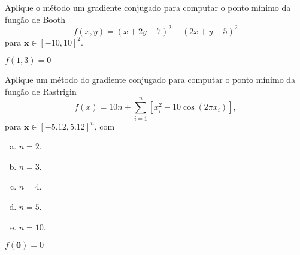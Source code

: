 \begin{exer}
  Aplique o método um gradiente conjugado para computar o ponto mínimo da função de Booth
  \begin{equation}
    f(x,y) = \left( x + 2y -7\right)^{2} + \left(2x +y - 5\right)^{2}
  \end{equation}
  para $\pmb{x}\in [-10, 10]^2$.
\end{exer}
\begin{resp}
  $f(1,3)=0$
\end{resp}

\begin{exer}
  Aplique um método do gradiente conjugado para computar o ponto mínimo da função de Rastrigin
  \begin{equation}
    f(x) = 10 n + \sum_{i=1}^n \left[x_i^2 - 10\cos(2 \pi x_i)\right],
  \end{equation}
  para $\pmb{x}\in[-5.12, 5.12]^n$, com
  \begin{enumerate}[a)]
    \item $n = 2$.
    \item $n = 3$.
    \item $n = 4$.
    \item $n = 5$.
    \item $n = 10$.
  \end{enumerate}
\end{exer}
\begin{resp}
$f(\pmb{0}) = 0$
\end{resp}
